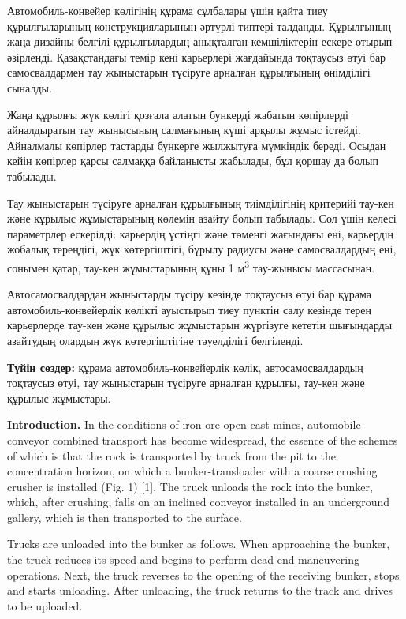 Автомобиль-конвейер көлігінің құрама сұлбалары үшін қайта тиеу
құрылғыларының конструкцияларының әртүрлі типтері талданды. Құрылғының
жаңа дизайны белгілі құрылғылардың анықталған кемшіліктерін ескере
отырып әзірленді. Қазақстандағы темір кені карьерлері жағдайында
тоқтаусыз өтуі бар самосвалдармен тау жыныстарын түсіруге арналған
құрылғының өнімділігі сыналды.

Жаңа құрылғы жүк көлігі қозғала алатын бункерді жабатын көпірлерді
айналдыратын тау жынысының салмағының күші арқылы жұмыс істейді.
Айналмалы көпірлер тастарды бункерге жылжытуға мүмкіндік береді. Осыдан
кейін көпірлер қарсы салмаққа байланысты жабылады, бұл қоршау да болып
табылады.

Тау жыныстарын түсіруге арналған құрылғының тиімділігінің критерийі
тау-кен және құрылыс жұмыстарының көлемін азайту болып табылады. Сол
үшін келесі параметрлер ескерілді: карьердің үстіңгі және төменгі
жағындағы ені, карьердің жобалық тереңдігі, жүк көтергіштігі, бұрылу
радиусы және самосвалдардың ені, сонымен қатар, тау-кен жұмыстарының
құны 1 м\textsuperscript{3} тау-жынысы массасынан.

Автосамосвалдардан жыныстарды түсіру кезінде тоқтаусыз өтуі бар құрама
автомобиль-конвейерлік көлікті ауыстырып тиеу пунктін салу кезінде терең
карьерлерде тау-кен және құрылыс жұмыстарын жүргізуге кететін шығындарды
азайтудың олардың жүк көтергіштігіне тәуелділігі белгіленді.

{\bfseries Түйін сөздер:} құрама автомобиль-конвейерлік көлік,
автосамосвалдардың тоқтаусыз өтуі, тау жыныстарын түсіруге арналған
құрылғы, тау-кен және құрылыс жұмыстары.

{\bfseries Introduction.} In the conditions of iron ore open-cast mines,
automobile-conveyor combined transport has become widespread, the
essence of the schemes of which is that the rock is transported by truck
from the pit to the concentration horizon, on which a bunker-transloader
with a coarse crushing crusher is installed (Fig. 1) {[}1{]}. The truck
unloads the rock into the bunker, which, after crushing, falls on an
inclined conveyor installed in an underground gallery, which is then
transported to the surface.

Trucks are unloaded into the bunker as follows. When approaching the
bunker, the truck reduces its speed and begins to perform dead-end
maneuvering operations. Next, the truck reverses to the opening of the
receiving bunker, stops and starts unloading. After unloading, the truck
returns to the track and drives to be uploaded.

